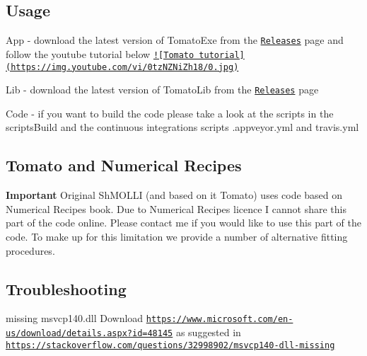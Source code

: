 \subsection*{Usage}


\begin{DoxyItemize}
\item App -\/ download the latest version of {\ttfamily Tomato\-Exe} from the \href{https://github.com/MRKonrad/tomato/releases}{\tt Releases} page and follow the youtube tutorial below \href{https://www.youtube.com/watch?v=0tzNZNiZh18}{\tt !\mbox{[}Tomato tutorial\mbox{]}(https\-://img.\-youtube.\-com/vi/0tz\-N\-Z\-Ni\-Zh18/0.\-jpg)}
\item Lib -\/ download the latest version of {\ttfamily Tomato\-Lib} from the \href{https://github.com/MRKonrad/tomato/releases}{\tt Releases} page
\item Code -\/ if you want to build the code please take a look at the scripts in the {\ttfamily scripts\-Build} and the continuous integrations scripts {\ttfamily .appveyor.\-yml} and {\ttfamily travis.\-yml}
\end{DoxyItemize}

\subsection*{Tomato and Numerical Recipes}

{\bfseries Important} Original Sh\-M\-O\-L\-L\-I (and based on it Tomato) uses code based on Numerical Recipes book. Due to Numerical Recipes licence I cannot share this part of the code online. Please contact me if you would like to use this part of the code. To make up for this limitation we provide a number of alternative fitting procedures.

\subsection*{Troubleshooting}


\begin{DoxyItemize}
\item missing msvcp140.\-dll Download \href{https://www.microsoft.com/en-us/download/details.aspx?id=48145}{\tt https\-://www.\-microsoft.\-com/en-\/us/download/details.\-aspx?id=48145} as suggested in \href{https://stackoverflow.com/questions/32998902/msvcp140-dll-missing}{\tt https\-://stackoverflow.\-com/questions/32998902/msvcp140-\/dll-\/missing}
\end{DoxyItemize}

